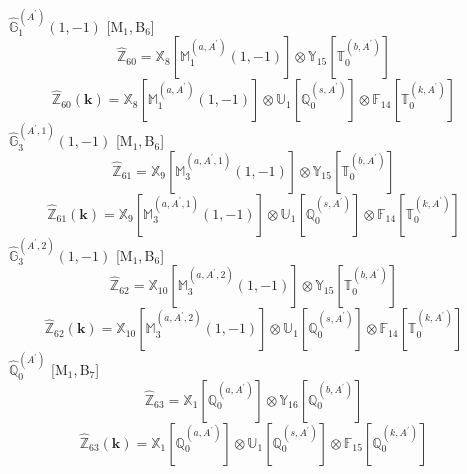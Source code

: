 \documentclass[fleqn,10pt,landscape]{article}
\begin{document}
\begin{itemize}
\begin{dmath*}
\end{dmath*}
\vspace{4mm}
\noindent {} $\,\,\,\hat{\mathbb{G}}_{1}^{(A^{\prime})}(1,-1)$ [M$_{1}$,\,B$_{6}$]
\begin{dmath*}
\hat{\mathbb{Z}}_{60}=\mathbb{X}_{8}[\mathbb{M}_{1}^{(a,A^{\prime})}(1,-1)] \otimes\mathbb{Y}_{15}[\mathbb{T}_{0}^{(b,A^{\prime})}]
\end{dmath*}
\begin{dmath*}
\hat{\mathbb{Z}}_{60}(\bm{k})=\mathbb{X}_{8}[\mathbb{M}_{1}^{(a,A^{\prime})}(1,-1)] \otimes\mathbb{U}_{1}[\mathbb{Q}_{0}^{(s,A^{\prime})}] \otimes\mathbb{F}_{14}[\mathbb{T}_{0}^{(k,A^{\prime})}]
\end{dmath*}
\vspace{4mm}
\noindent {} $\,\,\,\hat{\mathbb{G}}_{3}^{(A^{\prime},1)}(1,-1)$ [M$_{1}$,\,B$_{6}$]
\begin{dmath*}
\hat{\mathbb{Z}}_{61}=\mathbb{X}_{9}[\mathbb{M}_{3}^{(a,A^{\prime},1)}(1,-1)] \otimes\mathbb{Y}_{15}[\mathbb{T}_{0}^{(b,A^{\prime})}]
\end{dmath*}
\begin{dmath*}
\hat{\mathbb{Z}}_{61}(\bm{k})=\mathbb{X}_{9}[\mathbb{M}_{3}^{(a,A^{\prime},1)}(1,-1)] \otimes\mathbb{U}_{1}[\mathbb{Q}_{0}^{(s,A^{\prime})}] \otimes\mathbb{F}_{14}[\mathbb{T}_{0}^{(k,A^{\prime})}]
\end{dmath*}
\vspace{4mm}
\noindent {} $\,\,\,\hat{\mathbb{G}}_{3}^{(A^{\prime},2)}(1,-1)$ [M$_{1}$,\,B$_{6}$]
\begin{dmath*}
\hat{\mathbb{Z}}_{62}=\mathbb{X}_{10}[\mathbb{M}_{3}^{(a,A^{\prime},2)}(1,-1)] \otimes\mathbb{Y}_{15}[\mathbb{T}_{0}^{(b,A^{\prime})}]
\end{dmath*}
\begin{dmath*}
\hat{\mathbb{Z}}_{62}(\bm{k})=\mathbb{X}_{10}[\mathbb{M}_{3}^{(a,A^{\prime},2)}(1,-1)] \otimes\mathbb{U}_{1}[\mathbb{Q}_{0}^{(s,A^{\prime})}] \otimes\mathbb{F}_{14}[\mathbb{T}_{0}^{(k,A^{\prime})}]
\end{dmath*}
\vspace{4mm}
\noindent {} $\,\,\,\hat{\mathbb{Q}}_{0}^{(A^{\prime})}$ [M$_{1}$,\,B$_{7}$]
\begin{dmath*}
\hat{\mathbb{Z}}_{63}=\mathbb{X}_{1}[\mathbb{Q}_{0}^{(a,A^{\prime})}] \otimes\mathbb{Y}_{16}[\mathbb{Q}_{0}^{(b,A^{\prime})}]
\end{dmath*}
\begin{dmath*}
\hat{\mathbb{Z}}_{63}(\bm{k})=\mathbb{X}_{1}[\mathbb{Q}_{0}^{(a,A^{\prime})}] \otimes\mathbb{U}_{1}[\mathbb{Q}_{0}^{(s,A^{\prime})}] \otimes\mathbb{F}_{15}[\mathbb{Q}_{0}^{(k,A^{\prime})}]

\end{dmath*}
\end{itemize}
\end{document}
